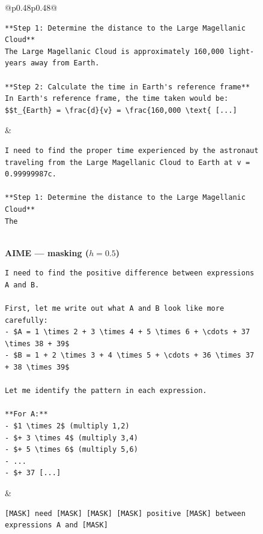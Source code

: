 \begin{figure}[p]
\begin{tabular}{@{}p{}p{}@{}}
\begin{tcolorbox}
\begin{lstlisting}
**Step 1: Determine the distance to the Large Magellanic Cloud**
The Large Magellanic Cloud is approximately 160,000 light-years away from Earth.

**Step 2: Calculate the time in Earth's reference frame**
In Earth's reference frame, the time taken would be:
$$t_{Earth} = \frac{d}{v} = \frac{160,000 \text{ [...]
\end{lstlisting}
\end{tcolorbox} & \begin{tcolorbox}[
    colback=gray!3, colframe=red!60!black, boxrule=0.5pt,
    title={\scriptsize\textbf{truncation applied}},
    fonttitle=\sffamily, coltitle=white, colbacktitle=red!60!black,
    left=3pt, right=3pt, top=1pt, bottom=1pt
]
\begin{lstlisting}
I need to find the proper time experienced by the astronaut traveling from the Large Magellanic Cloud to Earth at v = 0.99999987c.

**Step 1: Determine the distance to the Large Magellanic Cloud**
The
\end{lstlisting}
\end{tcolorbox} \\[6pt]
\textbf{\sffamily\small AIME --- masking ($h = 0.5$)} \\[2pt]
\begin{tcolorbox}[
    colback=gray!3, colframe=blue!60!black, boxrule=0.5pt,
    title={\scriptsize\textbf{full hint}},
    fonttitle=\sffamily, coltitle=white, colbacktitle=blue!60!black,
    left=3pt, right=3pt, top=1pt, bottom=1pt
]
\begin{lstlisting}
I need to find the positive difference between expressions A and B.

First, let me write out what A and B look like more carefully:
- $A = 1 \times 2 + 3 \times 4 + 5 \times 6 + \cdots + 37 \times 38 + 39$
- $B = 1 + 2 \times 3 + 4 \times 5 + \cdots + 36 \times 37 + 38 \times 39$

Let me identify the pattern in each expression.

**For A:**
- $1 \times 2$ (multiply 1,2)
- $+ 3 \times 4$ (multiply 3,4)
- $+ 5 \times 6$ (multiply 5,6)
- ...
- $+ 37 [...]
\end{lstlisting}
\end{tcolorbox} & \begin{tcolorbox}[
    colback=gray!3, colframe=red!60!black, boxrule=0.5pt,
    title={\scriptsize\textbf{masking applied}},
    fonttitle=\sffamily, coltitle=white, colbacktitle=red!60!black,
    left=3pt, right=3pt, top=1pt, bottom=1pt
]
\begin{lstlisting}
[MASK] need [MASK] [MASK] [MASK] positive [MASK] between expressions A and [MASK]


\end{lstlisting}
\end{tcolorbox}
\end{tabular}
\end{figure}

